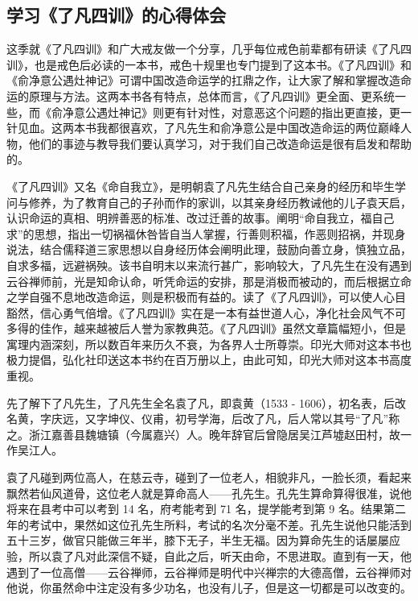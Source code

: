 \subsection{学习《了凡四训》的心得体会}

这季就《了凡四训》和广大戒友做一个分享，几乎每位戒色前辈都有研读《了凡四训》，也是戒色后必读的一本书，戒色十规里也专门提到了这本书。《了凡四训》和《俞净意公遇灶神记》可谓中国改造命运学的扛鼎之作，让大家了解和掌握改造命运的原理与方法。这两本书各有特点，总体而言，《了凡四训》更全面、更系统一些，而《俞净意公遇灶神记》则更有针对性，对意恶这个问题的指出更直接，更一针见血。这两本书我都很喜欢，了凡先生和俞净意公是中国改造命运的两位巅峰人物，他们的事迹与教导我们要认真学习，对于我们自己改造命运是很有启发和帮助的。

《了凡四训》又名《命自我立》，是明朝袁了凡先生结合自己亲身的经历和毕生学问与修养，为了教育自己的子孙而作的家训，以其亲身经历教诫他的儿子袁天启，认识命运的真相、明辨善恶的标准、改过迁善的故事。阐明“命自我立，福自己求”的思想，指出一切祸福休咎皆自当人掌握，行善则积福，作恶则招祸，并现身说法，结合儒释道三家思想以自身经历体会阐明此理，鼓励向善立身，慎独立品，自求多福，远避祸殃。该书自明末以来流行甚广，影响较大，了凡先生在没有遇到云谷禅师前，光是知命认命，听凭命运的安排，那是消极而被动的，而后根据立命之学自强不息地改造命运，则是积极而有益的。读了《了凡四训》，可以使人心目豁然，信心勇气倍增。《了凡四训》实在是一本有益世道人心，净化社会风气不可多得的佳作，越来越被后人誉为家教典范。《了凡四训》虽然文章篇幅短小，但是寓理内涵深刻，所以数百年来历久不衰，为各界人士所尊崇。印光大师对这本书也极力提倡，弘化社印送这本书约在百万册以上，由此可知，印光大师对这本书高度重视。

先了解下了凡先生，了凡先生全名袁了凡，即袁黄（1533 - 1606），初名表，后改名黄，字庆远，又字坤仪、仪甫，初号学海，后改了凡，后人常以其号“了凡”称之。浙江嘉善县魏塘镇（今属嘉兴）人。晚年辞官后曾隐居吴江芦墟赵田村，故一作吴江人。

袁了凡碰到两位高人，在慈云寺，碰到了一位老人，相貌非凡，一脸长须，看起来飘然若仙风道骨，这位老人就是算命高人——孔先生。孔先生算命算得很准，说他将来在县考中可以考到 14 名，府考能考到 71 名，提学能考到第 9 名。结果第二年的考试中，果然如这位孔先生所料，考试的名次分毫不差。孔先生说他只能活到五十三岁，做官只能做三年半，膝下无子，半生无福。因为算命先生的话屡屡应验，所以袁了凡对此深信不疑，自此之后，听天由命，不思进取。直到有一天，他遇到了一位高僧——云谷禅师，云谷禅师是明代中兴禅宗的大德高僧，云谷禅师对他说，你虽然命中注定没有多少功名，也没有儿子，但是这一切都是可以改变的。

